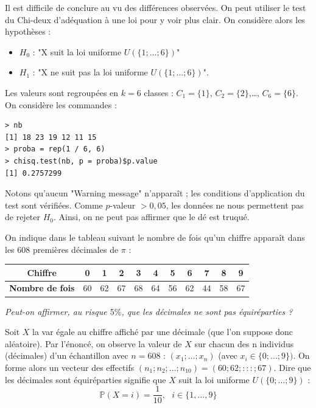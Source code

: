 Il est difficile de conclure au vu des différences observées.\newline
On peut utiliser le test du Chi-deux d’adéquation à une loi pour y voir plus clair. On considère alors les hypothèses :
\begin{itemize}
  \item $H_{0}$ : "X suit la loi uniforme $\mathit{U}(\{1; \dots ; 6\})$"
  \item $H_{1}$ : "X ne suit pas la loi uniforme $\mathit{U}(\{1; \dots ; 6\})$".
\end{itemize}
Les valeurs sont regroupées en $k = 6$ classes : $C_{1} = \{1\}$, $C_{2} = \{2\}$,\dots, $C_{6} = \{6\}$.\newline
On considère les commandes :
\begin{lstlisting}[language=html]
> nb
[1] 18 23 19 12 11 15
> proba = rep(1 / 6, 6)
> chisq.test(nb, p = proba)$p.value
[1] 0.2757299
\end{lstlisting}
Notons qu’aucun "Warning message" n’apparaît ; les conditions d’application du test sont vérifiées.\newline
Comme $p$-valeur $> 0,05$, les données ne nous permettent pas de rejeter $H_{0}$. Ainsi, on ne peut pas affirmer que le dé est truqué.



On indique dans le tableau suivant le nombre de fois qu’un chiffre apparaît dans les $608$ premières décimales de $\pi$ : 
\begin{center}
\begin{tabular}{|c|c|c|c|c|c|c|c|c|c|c|}
\hline
\textbf{Chiffre}        & 0  & 1  & 2  & 3  & 4  & 5  & 6  & 7  & 8  & 9  \\ \hline
\textbf{Nombre de fois} & 60 & 62 & 67 & 68 & 64 & 56 & 62 & 44 & 58 & 67 \\ \hline
\end{tabular}
\end{center}
\textit{Peut-on affirmer, au risque $5\%$, que les décimales ne sont pas équiréparties ?}



Soit $X$ la var égale au chiffre affiché par une décimale (que l’on suppose donc aléatoire).\newline
Par l’énoncé, on observe la valeur de $X$ sur chacun des n individus (décimales) d’un échantillon avec $n = 608$ : $(x_{1}; \dots ; x_{n})$ (avec $x_{i} \in \{0; \dots ; 9 \})$. On forme alors un vecteur des effectifs $(n_{1}; n_{2}; \dots ; n_{10}) = (60; 62; : : : ; 67)$. Dire que les décimales sont équiréparties signifie que $X$ suit la loi uniforme $\mathit{U}(\{0; \dots ; 9\})$ :
$$\mathbb{P}(X=i) = \frac{1}{10}, \textrm{ } i \in \{1,\dots, 9\}$$

